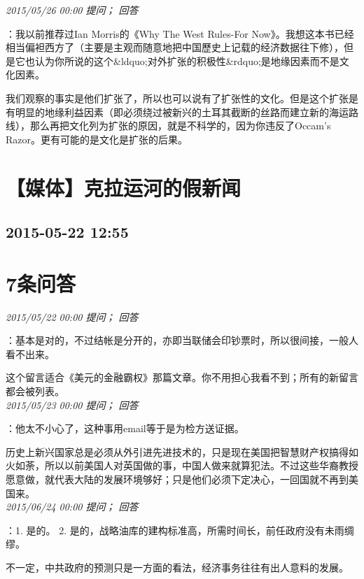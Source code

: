 \documentclass[twocolumn]{ctexart}
\begin{document}
\textit{\hfill\noindent\small 2015/05/26 00:00 提问； 回答}

：我以前推荐过Ian Morris的《Why The West Rules-For Now》。我想这本书已经相当偏袒西方了（主要是主观而随意地把中国歷史上记载的经济数据往下修），但是它也认为你所说的这个\&ldquo;对外扩张的积极性\&rdquo;是地缘因素而不是文化因素。

我们观察的事实是他们扩张了，所以也可以说有了扩张性的文化。但是这个扩张是有明显的地缘利益因素（即必须绕过被新兴的土耳其截断的丝路而建立新的海运路线），那么再把文化列为扩张的原因，就是不科学的，因为你违反了Occam's Razor。更有可能的是文化是扩张的后果。\\


\section{【媒体】克拉运河的假新闻}
\subsection{2015-05-22 12:55}


\section{7条问答}

\textit{\hfill\noindent\small 2015/05/22 00:00 提问； 回答}

：基本是对的，不过结帐是分开的，亦即当联储会印钞票时，所以很间接，一般人看不出来。

这个留言适合《美元的金融霸权》那篇文章。你不用担心我看不到；所有的新留言都会被列表。\\

\textit{\hfill\noindent\small 2015/05/23 00:00 提问； 回答}

：他太不小心了，这种事用email等于是为检方送证据。

历史上新兴国家总是必须从外引进先进技术的，只是现在美国把智慧财产权搞得如火如荼，所以以前美国人对英国做的事，中国人做来就算犯法。不过这些华裔教授愿意做，就代表大陆的发展环境够好；只是他们必须下定决心，一回国就不再到美国来。\\

\textit{\hfill\noindent\small 2015/06/24 00:00 提问； 回答}

：1. 是的。
2. 是的，战略油库的建构标准高，所需时间长，前任政府没有未雨绸缪。

不一定，中共政府的预测只是一方面的看法，经济事务往往有出人意料的发展。\\
\end{document}
